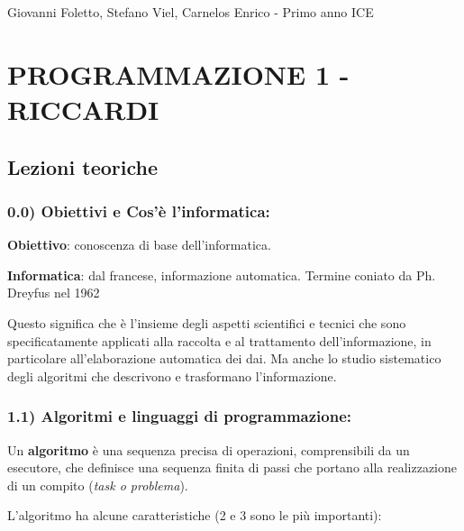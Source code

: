 \documentclass[
  paper=a4,
  oneside  ,captions=tableheading
]{scrbook}
\begin{document}



Giovanni Foletto, Stefano Viel, Carnelos Enrico - Primo anno ICE

\hypertarget{programmazione-1---riccardi}{%
\section{PROGRAMMAZIONE 1 -
RICCARDI}\label{programmazione-1---riccardi}}

\hypertarget{lezioni-teoriche}{%
\subsection{Lezioni teoriche}\label{lezioni-teoriche}}

\hypertarget{obiettivi-e-cosuxe8-linformatica}{%
\subsubsection{0.0) Obiettivi e Cos'è
l'informatica:}\label{obiettivi-e-cosuxe8-linformatica}}

\hspace{0pt} \textbf{Obiettivo}: conoscenza di base dell'informatica.

\hspace{0pt} \textbf{Informatica}: dal francese, informazione
automatica. Termine coniato da Ph. Dreyfus nel 1962

\hspace{0pt} Questo significa che è l'insieme degli aspetti scientifici
e tecnici che sono specificatamente applicati alla raccolta e al
trattamento dell'informazione, in particolare all'elaborazione
automatica dei dai. Ma anche lo studio sistematico degli algoritmi che
descrivono e trasformano l'informazione.

\hypertarget{algoritmi-e-linguaggi-di-programmazione}{
\subsubsection{1.1) Algoritmi e linguaggi di
programmazione:}\label{algoritmi-e-linguaggi-di-programmazione}}

Un \textbf{algoritmo} è una sequenza precisa di operazioni,
comprensibili da un esecutore, che definisce una sequenza finita di
passi che portano alla realizzazione di un compito (\emph{task o
problema}).

L'algoritmo ha alcune caratteristiche (2 e 3 sono le più importanti):
\end{document}
